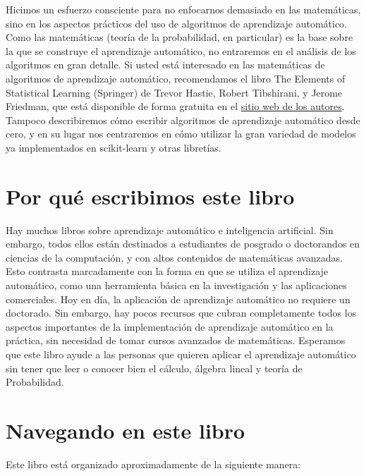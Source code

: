 Hicimos un esfuerzo consciente para no enfocarnos demasiado en las matemáticas, sino en los aspectos prácticos del uso de algoritmos de aprendizaje automático. Como las matemáticas (teoría de la probabilidad, en particular) es la base sobre la que se construye el aprendizaje automático, no entraremos en el análisis de los algoritmos en gran detalle. Si usted está interesado en las matemáticas de algoritmos de aprendizaje automático, recomendamos el libro The Elements of Statistical Learning (Springer) de Trevor Hastie, Robert Tibshirani, y Jerome Friedman, que está disponible de forma gratuita en el   \href{https://web.stanford.edu/~hastie/ElemStatLearn//}{\color{vino}  sitio web de los autores}. Tampoco describiremos cómo escribir algoritmos de aprendizaje automático desde cero, y en su lugar nos 
centraremos en  cómo utilizar la gran variedad de modelos ya implementados en {\ttfamily scikit-learn} y otras libretías. 

\section*{Por qué escribimos este libro}

Hay muchos libros sobre aprendizaje automático e inteligencia artificial.
Sin embargo, todos ellos están destinados a estudiantes de posgrado o doctorandos en ciencias de la computación, y con altos contenidos   de matemáticas avanzadas. Esto contrasta marcadamente con la forma en que se utiliza el aprendizaje automático, como una herramienta básica en la investigación y las aplicaciones comerciales. Hoy en día, la aplicación de aprendizaje automático no requiere un doctorado. Sin embargo, hay pocos recursos  que cubran completamente todos los aspectos importantes de la implementación de aprendizaje automático en la práctica, sin necesidad de tomar cursos avanzados de matemáticas. Esperamos que este libro ayude a las personas que quieren aplicar el aprendizaje automático sin tener que  leer o conocer bien el  cálculo, álgebra lineal y teoría de Probabilidad.



\section*{Navegando en este libro}


Este libro está organizado aproximadamente de la siguiente manera: 

